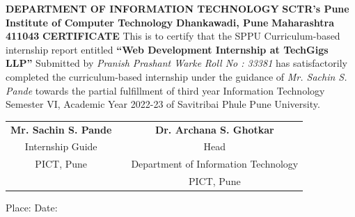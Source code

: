 \documentclass[a4paper, 12pt]{article}
\begin{document}
\begin{titlepage}
\begin{center}
\textbf{\linebreak \large{DEPARTMENT OF INFORMATION TECHNOLOGY}}
\linebreak
\linebreak
\textbf{SCTR's Pune Institute of Computer Technology}
\linebreak
\textbf{Dhankawadi, Pune}
\linebreak
\textbf{Maharashtra 411043}
\linebreak
\linebreak
\textbf{\Large{CERTIFICATE}}
\linebreak
\linebreak
\linebreak
 This is to certify that the SPPU Curriculum-based internship report entitled
\linebreak
\textbf{“Web Development Internship at TechGigs LLP”}
\linebreak
\linebreak
Submitted by
\linebreak
\textit{Pranish Prashant Warke} \hspace{2mm} 
\linebreak \textit{Roll No : 33381}
\linebreak
\linebreak
has satisfactorily completed the curriculum-based internship under the guidance of \textit{Mr. Sachin S. Pande } towards the partial fulfillment of third year
Information Technology Semester VI, Academic Year 2022-23 of Savitribai Phule Pune University.
\linebreak
\linebreak
\linebreak
\linebreak
\linebreak
\begin{table}[h]
\begin{tabular}{ccc}
\textbf{Mr. Sachin S. Pande}   &                        &  \hspace{36mm}\textbf{Dr. Archana S. Ghotkar}\\
Internship Guide      &                     &    \hspace{36mm} Head \\
PICT, Pune          &                         &       \hspace{28mm} Department of Information Technology \\
                    &                       & \hspace{36mm} PICT, Pune
\end{tabular}
\end{table}
\end{center}
Place:
\linebreak
Date:
\end{titlepage}
\end{document}
